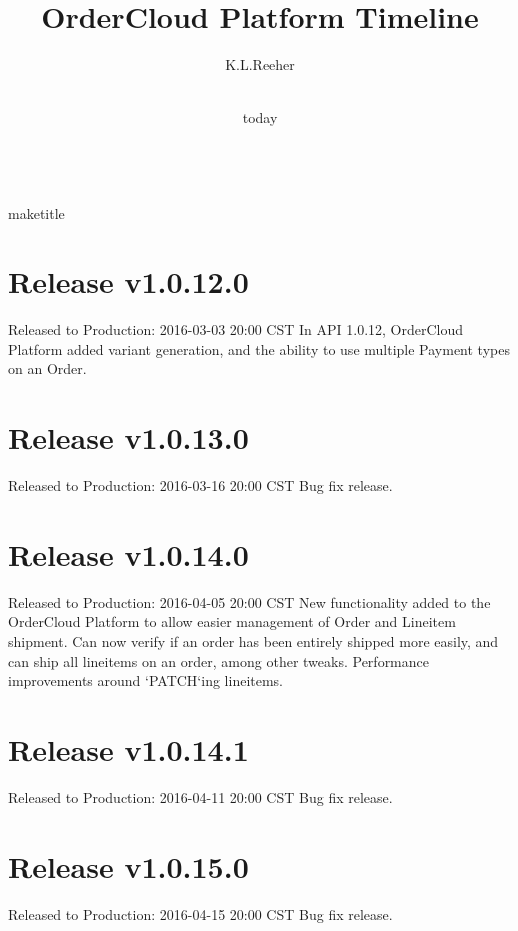 \documentclass{article}%
\title{OrderCloud Platform Timeline}%
\author{K.L.Reeher}%
\date{\\today}%
\begin{document}
%
\normalsize%
\\maketitle%
\section{Release v1.0.12.0}%
\label{sec:Release v1.0.12.0}%
Released to Production: 2016{-}03{-}03 20:00 CST%
\newline%
In API 1.0.12, OrderCloud Platform added variant generation, and the ability to use multiple Payment types on an Order.

%
\section{Release v1.0.13.0}%
\label{sec:Release v1.0.13.0}%
Released to Production: 2016{-}03{-}16 20:00 CST%
\newline%
Bug fix release.

%
\section{Release v1.0.14.0}%
\label{sec:Release v1.0.14.0}%
Released to Production: 2016{-}04{-}05 20:00 CST%
\newline%
New functionality added to the OrderCloud Platform to allow easier management of Order and Lineitem shipment. Can now verify if an order has been entirely shipped more easily, and can ship all lineitems on an order, among other tweaks. Performance improvements around `PATCH`ing lineitems.

%
\section{Release v1.0.14.1}%
\label{sec:Release v1.0.14.1}%
Released to Production: 2016{-}04{-}11 20:00 CST%
\newline%
Bug fix release.

%
\section{Release v1.0.15.0}%
\label{sec:Release v1.0.15.0}%
Released to Production: 2016{-}04{-}15 20:00 CST%
\newline%
Bug fix release.

%
\end{document}
